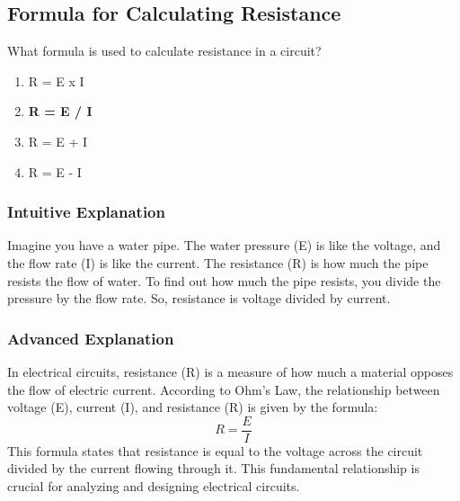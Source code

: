 \subsection{Formula for Calculating Resistance}
\label{T5D03}

\begin{tcolorbox}[colback=gray!10!white,colframe=black!75!black,title=T5D03]
What formula is used to calculate resistance in a circuit?
\begin{enumerate}[noitemsep]
    \item R = E x I
    \item \textbf{R = E / I}
    \item R = E + I
    \item R = E - I
\end{enumerate}
\end{tcolorbox}

\subsubsection*{Intuitive Explanation}
Imagine you have a water pipe. The water pressure (E) is like the voltage, and the flow rate (I) is like the current. The resistance (R) is how much the pipe resists the flow of water. To find out how much the pipe resists, you divide the pressure by the flow rate. So, resistance is voltage divided by current.

\subsubsection*{Advanced Explanation}
In electrical circuits, resistance (R) is a measure of how much a material opposes the flow of electric current. According to Ohm's Law, the relationship between voltage (E), current (I), and resistance (R) is given by the formula:
\[
R = \frac{E}{I}
\]
This formula states that resistance is equal to the voltage across the circuit divided by the current flowing through it. This fundamental relationship is crucial for analyzing and designing electrical circuits.